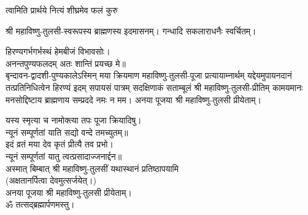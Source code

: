 
{त्वामिति प्रार्थये नित्यं शीघ्रमेव फलं कुरु}

श्री महाविष्णु-तुलसी-स्वरूपस्य ब्राह्मणस्य इदमासनम्। गन्धादि सकलाराधनैः स्वर्चितम्।

हिरण्यगर्भगर्भस्थं हेमबीजं विभावसोः।\\
अनन्तपुण्यफलदम् अतः शान्तिं प्रयच्छ मे॥\\

बृन्दावन-द्वादशी-पुण्यकालेऽस्मिन् मया क्रियमाण महाविष्णु-तुलसी-पूजा प्रत्यायाम्नार्थम्
यद्देयमुपायनदानं तत्प्रतिनिधित्वेन हिरण्यं इदम् सपायसं पात्रम् सदक्षिणाकं सताम्बूलं श्री महाविष्णु-तुलसी-प्रीतिम्
कामयमानः मनसोद्दिष्टाय ब्राह्मणाय सम्प्रददे नमः न मम।
अनया पूजया श्री महाविष्णु-तुलसी प्रीयेताम्।

यस्य स्मृत्या च नामोक्त्या तपः पूजा क्रियादिषु।\\
न्यूनं सम्पूर्णतां याति सद्यो वन्दे तमच्युतम्॥ \\
इदं व्रतं मया देव कृतं प्रीत्यै तव प्रभो।\\
न्यूनं सम्पूर्णतां यातु त्वत्प्रसादाज्जनार्द्दन॥\\

अस्मात् बिम्बात् श्री महाविष्णु-तुलसीं यथास्थानं प्रतिष्ठापयामि\\
(अक्षतानर्पित्वा देवमुत्सर्जयेत्।)\\
अनया पूजया श्री महाविष्णु-तुलसी प्रीयेताम्। \\
ॐ तत्सद्ब्रह्मार्पणमस्तु।